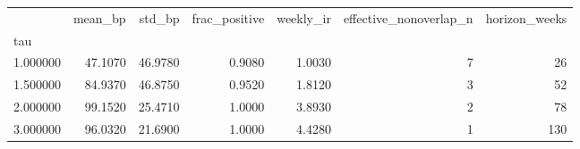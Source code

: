 \begin{tabular}{lrrrrrr}
\toprule
 & mean\_bp & std\_bp & frac\_positive & weekly\_ir & effective\_nonoverlap\_n & horizon\_weeks \\
tau &  &  &  &  &  &  \\
\midrule
1.000000 & 47.1070 & 46.9780 & 0.9080 & 1.0030 & 7 & 26 \\
1.500000 & 84.9370 & 46.8750 & 0.9520 & 1.8120 & 3 & 52 \\
2.000000 & 99.1520 & 25.4710 & 1.0000 & 3.8930 & 2 & 78 \\
3.000000 & 96.0320 & 21.6900 & 1.0000 & 4.4280 & 1 & 130 \\
\bottomrule
\end{tabular}
